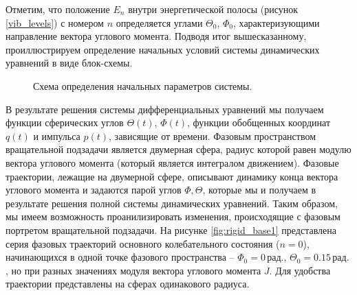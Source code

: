 Отметим, что положение $E_n$ внутри энергетической полосы (рисунок \eqref{vib_levels}) с номером $n$ определяется углами $\Theta_0$, $\Phi_0$, характеризующими направление вектора углового момента. Подводя итог вышесказанному, проиллюстрируем определение начальных условий системы динамических уравнений в виде блок-схемы.

\vverh
\begin{figure}[H]
  \begin{center}
    \caption{Схема определения начальных параметров системы.}
  \end{center}
\end{figure}

В результате решения системы дифференциальных уравнений мы получаем функции сферических углов $\Theta(t)$, $\Phi(t)$, функции обобщенных координат $q(t)$ и импульса $p(t)$, зависящие от времени. Фазовым пространством вращательной подзадачи является двумерная сфера, радиус которой равен модулю вектора углового момента (который является интегралом движением). Фазовые траектории, лежащие на двумерной сфере, описывают динамику конца вектора углового момента и задаются парой углов $\Phi, \Theta$, которые мы и получаем в результате решения полной системы динамических уравнений. Таким образом, мы имеем возможность проанилизировать изменения, происходящие с фазовым портретом вращательной подзадачи. На рисунке \eqref{fig:rigid_base1} представлена серия фазовых траекторий основного колебательного состояния ($n = 0$), начинающихся в одной точке фазового пространства  -- $\Phi_0 = 0 \, \text{рад.}$, $\Theta_0 = 0.15 \, \text{рад.}$ , но при разных значениях модуля вектора углового момента $J$. Для удобства траектории представлены на сферах одинакового радиуса.

